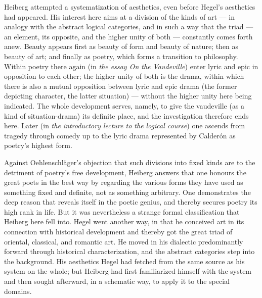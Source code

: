 \documentclass[12pt,a4paper]{book}
\newcommand{\opage}[1]{\marginnote{\footnotesize\textit{[#1]}}}
\begin{document}
Heiberg attempted a systematization of aesthetics, even before Hegel's aesthetics had
appeared. His interest here aims at a division of the kinds of art --- in analogy with the
abstract logical categories, and in such a way that the triad --- an element, its opposite, and
the higher unity of both --- constantly comes forth anew. Beauty appears first as beauty of
form and beauty of nature; then as beauty of art; and finally as poetry, which forms a
transition to philosophy. Within poetry there again (in \emph{the essay On the Vaudeville})
enter lyric and epic in opposition to each other; the higher unity of both is the drama, within
which there is also a mutual opposition between lyric and epic drama (the former depicting
character, the latter situation) --- without the higher unity here being indicated. The whole
development serves, namely, to give the vaudeville (as a kind of situation-drama) its definite
place, and the investigation therefore ends here. Later (in \emph{the introductory lecture to
the logical course}) one ascends from tragedy through comedy up to the lyric drama represented
by Calderón as poetry's highest form.

Against Oehlenschläger's objection that such divisions into fixed kinds are to the detriment of
poetry's free development, Heiberg answers that one honours the great poets in the best way by
regarding the various forms they have used as something fixed and definite, not as something
arbitrary. One demonstrates the deep reason that reveals itself in the poetic genius, and
thereby secures poetry its high rank in life. But it was nevertheless a strange formal
classification that Heiberg here fell into. Hegel went another way, in that he conceived art in
its connection with historical development and thereby got the great triad of oriental,
classical, and romantic art. He moved in his dialectic predominantly forward through historical
characterization, and the abstract categories step into the background. His aesthetics Hegel had
fetched from the same source as his system on the whole; but Heiberg had first familiarized
himself with the system and then sought afterward, \opage{134}in a schematic way, to apply it to the
special domains.
\end{document}
